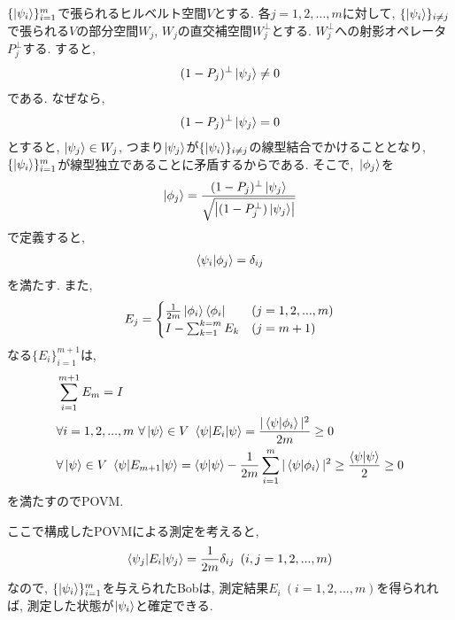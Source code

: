 \begin{ex}
    \label{ex2.64}
    $\{ \ket{\psi_i}\}_{i=1}^m$で張られるヒルベルト空間$V$とする. 各$j = 1, 2, \dots , m$に対して, $\{ \ket{\psi_i} \}_{i\neq j}$で張られる$V$の部分空間$W_j$, $W_j$の直交補空間$W_j^\perp$とする. $W_j^\perp$への射影オペレータ$P_j^\perp$する. すると, 
    \begin{align*}
        (1-P_j)^\perp \ket{\psi_j} \neq 0
    \end{align*}
    である. なぜなら, 
    \begin{align*}
        (1-P_j)^\perp \ket{\psi_j} = 0
    \end{align*}
    とすると, $\ket{\psi_j} \in W_j$, つまり$\ket{\psi_j}$が$\{ \ket{\psi_i} \}_{i\neq j}$の線型結合でかけることとなり, $\{ \ket{\psi_i}\}_{i=1}^m$が線型独立であることに矛盾するからである.
    そこで,\ $\ket{\phi_j}$を
    \begin{align*}
        \ket{\phi_j} = \frac{(1-P_j)^\perp \ket{\psi_j}}{ \sqrt{\left| (1-P_j^\perp) \ket{\psi_j} \right|}}
    \end{align*}
    で定義すると, 
    \begin{align*}
            \braket{\psi_i|\phi_j} = \delta_{ij}
    \end{align*}
    を満たす. また, 
    \begin{align*}
        E_j
        =
        \begin{cases}
            \frac{1}{2m} \ket{\phi_i} \bra{\phi_i} & (j=1,2, ...,m) \\
            I - \sum_{k=1}^{k=m} E_k    & (j=m+1)
        \end{cases}
    \end{align*}
    なる$\{ E_i\}_{i=1}^{m+1}$は,
    \begin{align*}
        &\sum_{i=1}^{m+1} E_m = I \\
        &\forall i = 1, 2, ..., m 
        \ \forall \ket{\psi} \in V
        \ \braket{\psi | E_i | \psi} = \frac{|\braket{\psi|\phi_i}|^2}{2m} \ge 0 \\
        &\forall \ket{\psi} \in V 
        \ \braket{\psi | E_{m+1} | \psi} 
        = \braket{\psi|\psi} - \frac{1}{2m}\sum_{i=1}^{m} |\braket{\psi|\phi_i}|^2
        \ge
        \frac{\braket{\psi|\psi}}{2} \ge 0
    \end{align*}
    を満たすのでPOVM.
    \par
    ここで構成したPOVMによる測定を考えると,
    \begin{align*}
        \braket{\psi_j | E_i | \psi_j} = \frac{1}{2m} \delta_{ij} 
        \ \left( i, j = 1, 2, ... ,m \right)
    \end{align*}
    なので, $\{ \ket{\psi_i}\}_{i=1}^m$を与えられたBobは, 測定結果$E_i \ (i = 1,2, ..., m)$を得られれば, 測定した状態が$\ket{\psi_i}$と確定できる.
\end{ex}

